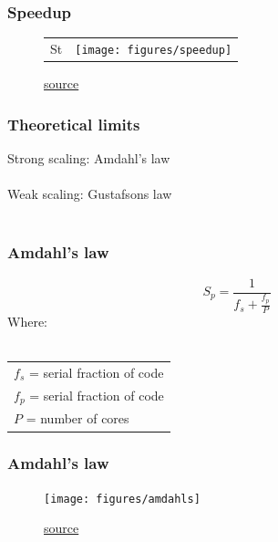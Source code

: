 \documentclass{beamer}
\begin{document}
\begin{frame}
	\frametitle{Speedup}
	\begin{figure}[t]
		\begin{center}
			\begin{tabular}{ c c }
				St & \texttt{[image: figures/speedup]}	\\
			\end{tabular}
		\end{center}
		\caption{\href{https://portal.tacc.utexas.edu/c/document_library/get_file?uuid=e05d457a-0fbf-424b-87ce-c96fc0077099&groupId=13601}{source}}
	\end{figure}
\end{frame}

\begin{frame}
	\frametitle{Theoretical limits}
	\begin{center}
		Strong scaling: Amdahl's law \\~\\
		
		Weak scaling: Gustafsons law \\~\\
	\end{center}
\end{frame}

\begin{frame}
	\frametitle{Amdahl's law}
	\begin{center}
		\begin{equation*}
			S_p = \frac{1}{f_s + \frac{f_p}{P}}
		\end{equation*}
		Where: \\~\\
		\begin{tabular}{ l }
		$f_s$ = serial fraction of code \\
		$f_p$ = serial fraction of code \\
		$P$ = number of cores \\
		\end{tabular}
	\end{center}
\end{frame}

\begin{frame}
	\frametitle{Amdahl's law}
	\begin{figure}[t]
		\begin{center}
				\texttt{[image: figures/amdahls]}	\\
		\end{center}
		\caption{\href{https://portal.tacc.utexas.edu/c/document_library/get_file?uuid=e05d457a-0fbf-424b-87ce-c96fc0077099&groupId=13601}{source}}
	\end{figure}
\end{frame}
\end{document}
